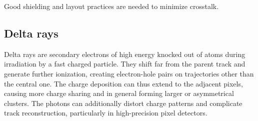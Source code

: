 Good shielding and layout practices are needed to minimize crosstalk.

\subsection{Delta rays}

Delta rays are secondary electrons of high energy knocked out of atoms during irradiation by a fast charged particle. They shift far from the parent track and generate further ionization, creating electron-hole pairs on trajectories other than the central one. The charge deposition can thus extend to the adjacent pixels, causing more charge sharing and in general forming larger or asymmetrical clusters. The photons can additionally distort charge patterns and complicate track reconstruction, particularly in high-precision pixel detectors.
